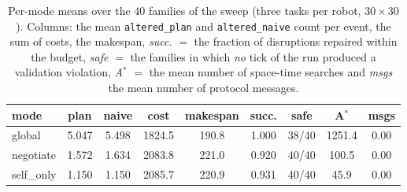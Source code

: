 \documentclass[10pt,a4paper]{article}
\newcommand{\code}[1]{\texttt{#1}}
\begin{document}
\begin{table}[H]
\centering
\small
\setlength{\tabcolsep}{5pt}
\begin{tabular}{@{}l c c c c c c c c@{}}
\toprule
\textbf{mode} & \textbf{plan} & \textbf{naive} & \textbf{cost} &
\textbf{makespan} & \textbf{succ.} & \textbf{safe} & \textbf{A$^\ast$} &
\textbf{msgs}\\
\midrule
global    & 5.047 & 5.498 & 1824.5 & 190.8 & 1.000 & 38/40 & 1251.4 & 0.00\\
negotiate & 1.572 & 1.634 & 2083.8 & 221.0 & 0.920 & 40/40 &  100.5 & 0.00\\
self\_only & 1.150 & 1.150 & 2085.7 & 220.9 & 0.931 & 40/40 &   45.9 & 0.00\\
\bottomrule
\end{tabular}
\caption{Per-mode means over the $40$ families of the sweep (three tasks per
robot, $30\times30$).  Columns: the mean \code{altered\_plan} and
\code{altered\_naive} count per event, the sum of costs, the makespan,
\emph{succ.} $=$ the fraction of disruptions repaired within the budget,
\emph{safe} $=$ the families in which \emph{no} tick of the run produced a
validation violation, \emph{A$^\ast$} $=$ the mean number of space-time
searches and \emph{msgs} the mean number of protocol messages.}
\label{tab:sweep}
\end{table}
\end{document}
